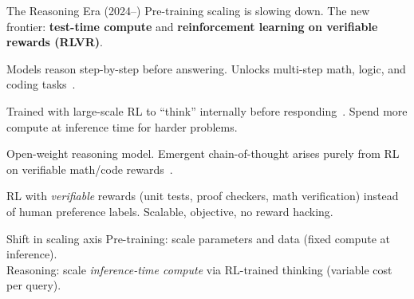 \begin{frame}{The Reasoning Era (2024--)}
  Pre-training scaling is slowing down. The new frontier: \textbf{test-time compute} and \textbf{reinforcement learning on verifiable rewards (RLVR)}.

  \begin{description}[style=nextline]
    \item[Chain-of-thought] Models reason step-by-step before answering. Unlocks multi-step math, logic, and coding tasks~\cite{wei2022cot}.
    \item[o1 / o3 (OpenAI, 2024--25)] Trained with large-scale RL to ``think'' internally before responding~\cite{openai2024o1, openai2025o3}. Spend more compute at inference time for harder problems.
    \item[DeepSeek-R1 (2025)] Open-weight reasoning model. Emergent chain-of-thought arises purely from RL on verifiable math/code rewards~\cite{deepseek_r1_2025}.
    \item[RLVR] RL with \emph{verifiable} rewards (unit tests, proof checkers, math verification) instead of human preference labels. Scalable, objective, no reward hacking.
  \end{description}

  \begin{alertblock}{Shift in scaling axis}
    Pre-training: scale parameters and data (fixed compute at inference).\\
    Reasoning: scale \emph{inference-time compute} via RL-trained thinking (variable cost per query).
  \end{alertblock}
\end{frame}

